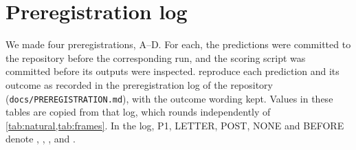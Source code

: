 
\section{Preregistration log}\label{app:prereg}

We made four preregistrations, A--D. For each, the predictions were committed to the repository before the corresponding run, and the scoring script was committed before its outputs were inspected.  reproduce each prediction and its outcome as recorded in the preregistration log of the repository (\texttt{docs/PREREGISTRATION.md}), with the outcome wording kept. Values in these tables are copied from that log, which rounds independently of \cref{tab:natural,tab:frames}. In the log, P1, LETTER, POST, NONE and BEFORE denote \fmtOpt{}, \fmtLetter{}, \fmtPost{}, \fmtNone{} and \fmtBefore{}.

